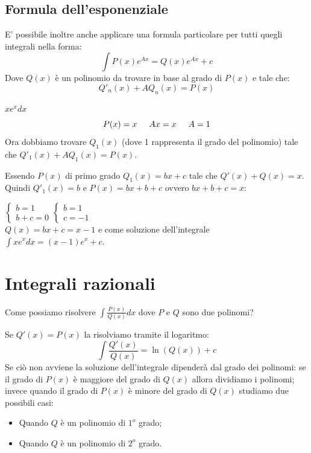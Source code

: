 \subsection*{Formula dell'esponenziale}
E' possibile inoltre anche applicare una formula particolare per tutti quegli integrali nella forma:
\begin{equation*}
    \int P(x)e^{Ax}=Q(x)e^{Ax}+c
\end{equation*}
Dove $Q(x)$ è un polinomio da trovare in base al grado di $P(x)$ e tale che:\begin{equation*}Q'_n(x)+AQ_n(x)=P(x)\end{equation*} 
\begin{example}
    $xe^xdx$\begin{equation*}P(x)=x\hspace{.5cm}Ax=x\hspace{.5cm}A=1\end{equation*}
    Ora dobbiamo trovare $Q_1(x)$ (dove 1 rappresenta il grado del polinomio) tale che $Q'_1(x)+AQ_1(x)=P(x)$.
    
    Essendo $P(x)$ di primo grado $Q_1(x)=bx+c$ tale che $Q'(x)+Q(x)=x$.\\Quindi $Q'_1(x)=b$ e $P(x)=bx+b+c$ ovvero $bx+b+c=x$:
    
    $\begin{cases}b=1\\b+c=0\end{cases}\begin{cases}b=1\\c=-1\end{cases}$\\
    $Q(x)=bx+c=x-1$ e come soluzione dell'integrale $\int xe^xdx=(x-1)e^x+c$.
\end{example}


\section{Integrali razionali}
Come possiamo risolvere $\int\frac{P(x)}{Q(x)}dx$ dove $P$ e $Q$ sono due polinomi?

Se $Q'(x)=P(x)$ la risolviamo tramite il logaritmo:\begin{equation*}\int\frac{Q'(x)}{Q(x)}=\ln(Q(x))+c\end{equation*}
Se ciò non avviene la soluzione dell'integrale dipenderà dal grado dei polinomi: se il grado di $P(x)$ è maggiore del grado di $Q(x)$ allora dividiamo i polinomi; invece quando il grado di $P(x)$ è minore del grado di $Q(x)$ studiamo due possibili casi:
\begin{itemize}
    \item Quando $Q$ è un polinomio di $1^o$ grado;
    \item Quando $Q$ è un polinomio di $2^o$ grado.
\end{itemize}

